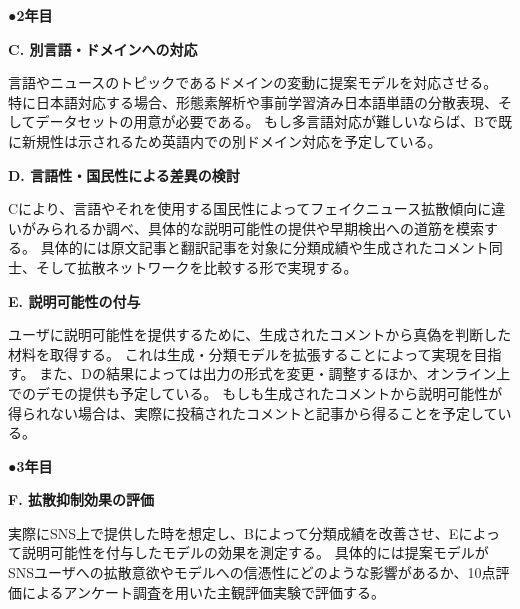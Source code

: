 {	%


	\noindent
	●\textbf{2年目}

	\noindent
	\textbf{C. 別言語・ドメインへの対応}

	言語やニュースのトピックであるドメインの変動に提案モデルを対応させる。
	特に日本語対応する場合、形態素解析や事前学習済み日本語単語の分散表現、そしてデータセットの用意が必要である。
	もし多言語対応が難しいならば、Bで既に新規性は示されるため英語内での別ドメイン対応を予定している。

	\noindent
	\textbf{D. 言語性・国民性による差異の検討}

	Cにより、言語やそれを使用する国民性によってフェイクニュース拡散傾向に違いがみられるか調べ、具体的な説明可能性の提供や早期検出への道筋を模索する。
	具体的には原文記事と翻訳記事を対象に分類成績や生成されたコメント同士、そして拡散ネットワークを比較する形で実現する。

	\noindent
	\textbf{E. 説明可能性の付与}

	ユーザに説明可能性を提供するために、生成されたコメントから真偽を判断した材料を取得する。
	これは生成・分類モデルを拡張することによって実現を目指す。
	また、Dの結果によっては出力の形式を変更・調整するほか、オンライン上でのデモの提供も予定している。
	もしも生成されたコメントから説明可能性が得られない場合は、実際に投稿されたコメントと記事から得ることを予定している。

	\noindent
	●\textbf{3年目}

	\noindent
	\textbf{F. 拡散抑制効果の評価}

	実際にSNS上で提供した時を想定し、Bによって分類成績を改善させ、Eによって説明可能性を付与したモデルの効果を測定する。
	具体的には提案モデルがSNSユーザへの拡散意欲やモデルへの信憑性にどのような影響があるか、10点評価によるアンケート調査を用いた主観評価実験で評価する。

}

